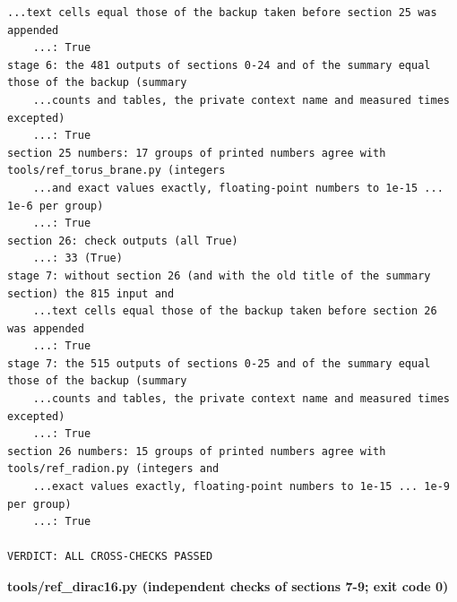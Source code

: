 \documentclass[10pt,a4paper]{article}
\begin{document}
\begin{Verbatim}[fontsize=\small,frame=single,framesep=2mm]
    ...text cells equal those of the backup taken before section 25 was appended               
    ...: True
stage 6: the 481 outputs of sections 0-24 and of the summary equal those of the backup (summary
    ...counts and tables, the private context name and measured times excepted)                
    ...: True
section 25 numbers: 17 groups of printed numbers agree with tools/ref_torus_brane.py (integers
    ...and exact values exactly, floating-point numbers to 1e-15 ... 1e-6 per group)           
    ...: True
section 26: check outputs (all True)                                                           
    ...: 33 (True)
stage 7: without section 26 (and with the old title of the summary section) the 815 input and
    ...text cells equal those of the backup taken before section 26 was appended               
    ...: True
stage 7: the 515 outputs of sections 0-25 and of the summary equal those of the backup (summary
    ...counts and tables, the private context name and measured times excepted)                
    ...: True
section 26 numbers: 15 groups of printed numbers agree with tools/ref_radion.py (integers and
    ...exact values exactly, floating-point numbers to 1e-15 ... 1e-9 per group)               
    ...: True

VERDICT: ALL CROSS-CHECKS PASSED
\end{Verbatim}
\textbf{tools/ref\_dirac16.py (independent checks of sections 7-9; exit code 0)}
\end{document}
